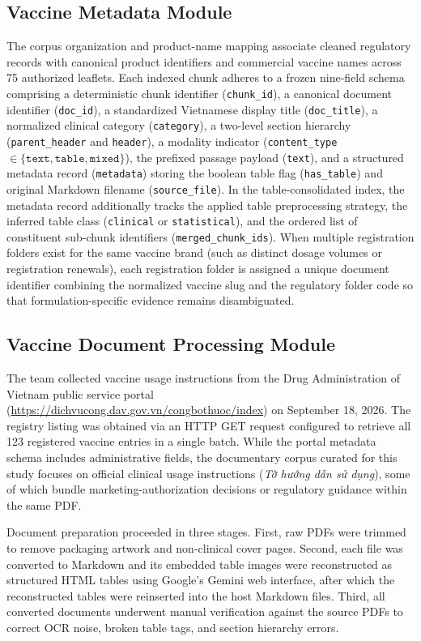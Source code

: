 \documentclass[sn-mathphys, oneside]{sn-jnl}
\newcommand{\vn}[1]{{\fontencoding{T5}\selectfont #1}}
\begin{document}
\subsection{Vaccine Metadata Module}
The corpus organization and product-name mapping associate cleaned regulatory records with canonical product identifiers and commercial vaccine names across 75 authorized leaflets. Each indexed chunk adheres to a frozen nine-field schema comprising a deterministic chunk identifier (\texttt{chunk\_id}), a canonical document identifier (\texttt{doc\_id}), a standardized Vietnamese display title (\texttt{doc\_title}), a normalized clinical category (\texttt{category}), a two-level section hierarchy (\texttt{parent\_header} and \texttt{header}), a modality indicator (\texttt{content\_type} $\in \{\texttt{text}, \texttt{table}, \texttt{mixed}\}$), the prefixed passage payload (\texttt{text}), and a structured metadata record (\texttt{metadata}) storing the boolean table flag (\texttt{has\_table}) and original Markdown filename (\texttt{source\_file}). In the table-consolidated index, the metadata record additionally tracks the applied table preprocessing strategy, the inferred table class (\texttt{clinical} or \texttt{statistical}), and the ordered list of constituent sub-chunk identifiers (\texttt{merged\_chunk\_ids}). When multiple registration folders exist for the same vaccine brand (such as distinct dosage volumes or registration renewals), each registration folder is assigned a unique document identifier combining the normalized vaccine slug and the regulatory folder code so that formulation-specific evidence remains disambiguated.

\subsection{Vaccine Document Processing Module}
The team collected vaccine usage instructions from the Drug Administration of Vietnam public service portal (\url{https://dichvucong.dav.gov.vn/congbothuoc/index}) on September 18, 2026. The registry listing was obtained via an HTTP GET request configured to retrieve all 123 registered vaccine entries in a single batch. While the portal metadata schema includes administrative fields, the documentary corpus curated for this study focuses on official clinical usage instructions (\emph{\vn{Tờ hướng dẫn sử dụng}}), some of which bundle marketing-authorization decisions or regulatory guidance within the same PDF.

Document preparation proceeded in three stages. First, raw PDFs were trimmed to remove packaging artwork and non-clinical cover pages. Second, each file was converted to Markdown and its embedded table images were reconstructed as structured HTML tables using Google's Gemini web interface, after which the reconstructed tables were reinserted into the host Markdown files. Third, all converted documents underwent manual verification against the source PDFs to correct OCR noise, broken table tags, and section hierarchy errors.
\end{document}
